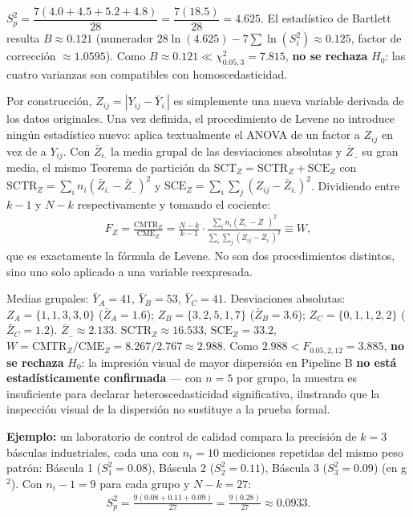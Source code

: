 \begin{solproblema}[prob:57b555d]
	$S_p^2 = \dfrac{7(4.0+4.5+5.2+4.8)}{28} = \dfrac{7(18.5)}{28} = 4.625$. El estadístico de Bartlett resulta $B\approx0.121$ (numerador $28\ln(4.625)-7\sum\ln(S_i^2)\approx0.125$, factor de corrección $\approx1.0595$). Como $B\approx0.121\ll\chi^2_{0.05,3}=7.815$, \textbf{no se rechaza} $H_0$: las cuatro varianzas son compatibles con homoscedasticidad.
\end{solproblema}

\begin{solproblema}[prob:e2546e4]
	Por construcción, $Z_{ij}=|Y_{ij}-\bar Y_{i.}|$ es simplemente una nueva variable derivada de los datos originales. Una vez definida, el procedimiento de Levene no introduce ningún estadístico nuevo: aplica textualmente el ANOVA de un factor a $Z_{ij}$ en vez de a $Y_{ij}$. Con $\bar Z_{i.}$ la media grupal de las desviaciones absolutas y $\bar Z_{..}$ su gran media, el mismo Teorema de partición da $\text{SCT}_Z=\text{SCTR}_Z+\text{SCE}_Z$ con $\text{SCTR}_Z=\sum_i n_i(\bar Z_{i.}-\bar Z_{..})^2$ y $\text{SCE}_Z=\sum_i\sum_j(Z_{ij}-\bar Z_{i.})^2$. Dividiendo entre $k-1$ y $N-k$ respectivamente y tomando el cociente:
	\begin{align*}
		F_Z = \frac{\text{CMTR}_Z}{\text{CME}_Z} = \frac{N-k}{k-1}\cdot\frac{\sum_i n_i(\bar Z_{i.}-\bar Z_{..})^2}{\sum_i\sum_j(Z_{ij}-\bar Z_{i.})^2} \equiv W,
	\end{align*}
	que es exactamente la fórmula de Levene. No son dos procedimientos distintos, sino uno solo aplicado a una variable reexpresada.
\end{solproblema}

\begin{solproblema}[prob:8dd2466]
	Medias grupales: $\bar Y_A=41$, $\bar Y_B=53$, $\bar Y_C=41$. Desviaciones absolutas: $Z_A=\{1,1,3,3,0\}$ ($\bar Z_A=1.6$); $Z_B=\{3,2,5,1,7\}$ ($\bar Z_B=3.6$); $Z_C=\{0,1,1,2,2\}$ ($\bar Z_C=1.2$). $\bar Z_{..}\approx2.133$. $\text{SCTR}_Z\approx16.533$, $\text{SCE}_Z=33.2$, $W=\text{CMTR}_Z/\text{CME}_Z = 8.267/2.767\approx2.988$. Como $2.988<F_{0.05,2,12}=3.885$, \textbf{no se rechaza} $H_0$: la impresión visual de mayor dispersión en Pipeline B \textbf{no está estadísticamente confirmada} — con $n=5$ por grupo, la muestra es insuficiente para declarar heteroscedasticidad significativa, ilustrando que la inspección visual de la dispersión no sustituye a la prueba formal.
\end{solproblema}

\begin{solproblema}[prob:095357b]
	\textbf{Ejemplo:} un laboratorio de control de calidad compara la precisión de $k=3$ básculas industriales, cada una con $n_i=10$ mediciones repetidas del mismo peso patrón: Báscula 1 ($S_1^2=0.08$), Báscula 2 ($S_2^2=0.11$), Báscula 3 ($S_3^2=0.09$) (en g$^2$). Con $n_i-1=9$ para cada grupo y $N-k=27$:
	\begin{align*}
		S_p^2 = \frac{9(0.08+0.11+0.09)}{27} = \frac{9(0.28)}{27} \approx0.0933.
	\end{align*}
\end{solproblema}
